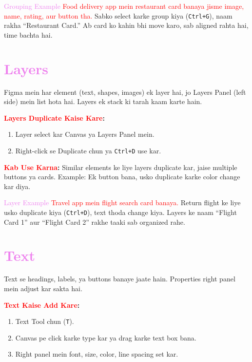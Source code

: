 \documentclass[a4paper]{article}
\begin{document}
\begin{examplebox}{\textcolor{violet}{Grouping Example}}
\textcolor{red}{Food delivery app mein restaurant card banaya jisme image, name, rating, aur button tha.} Sabko select karke group kiya (\texttt{Ctrl+G}), naam rakha “Restaurant Card.” \textcolor{examplegreen}{Ab card ko kahin bhi move karo, sab aligned rahta hai, time bachta hai.}
\end{examplebox}

\section*{\textbf{\LARGE \textcolor{violet}{Layers}}}
\textcolor{warningred}{Figma mein har element (text, shapes, images) ek layer hai, jo Layers Panel (left side) mein list hota hai.} Layers ek stack ki tarah kaam karte hain.

\textbf{\textcolor{red}{Layers Duplicate Kaise Kare}:}
\begin{enumerate}
  \item \textcolor{examplegreen}{Layer select kar Canvas ya Layers Panel mein.}
  \item \textcolor{examplegreen}{Right-click se Duplicate chun ya \texttt{Ctrl+D} use kar.}
\end{enumerate}

\textbf{\textcolor{red}{Kab Use Karna}:}
\textcolor{examplegreen}{Similar elements ke liye layers duplicate kar, jaise multiple buttons ya cards.} Example: Ek button bana, usko duplicate karke color change kar diya.

\begin{examplebox}{\textcolor{violet}{Layer Example}}
\textcolor{red}{Travel app mein flight search card banaya.} Return flight ke liye usko duplicate kiya (\texttt{Ctrl+D}), text thoda change kiya. \textcolor{examplegreen}{Layers ke naam “Flight Card 1” aur “Flight Card 2” rakhe taaki sab organized rahe.}
\end{examplebox}

\section*{\textbf{\LARGE \textcolor{violet}{Text}}}
\textcolor{warningred}{Text se headings, labels, ya buttons banaye jaate hain.} Properties right panel mein adjust kar sakta hai.

\textbf{\textcolor{red}{Text Kaise Add Kare}:}
\begin{enumerate}
  \item \textcolor{examplegreen}{Text Tool chun (\texttt{T}).}
  \item \textcolor{examplegreen}{Canvas pe click karke type kar ya drag karke text box bana.}
  \item \textcolor{examplegreen}{Right panel mein font, size, color, line spacing set kar.}
\end{enumerate}
\end{document}
